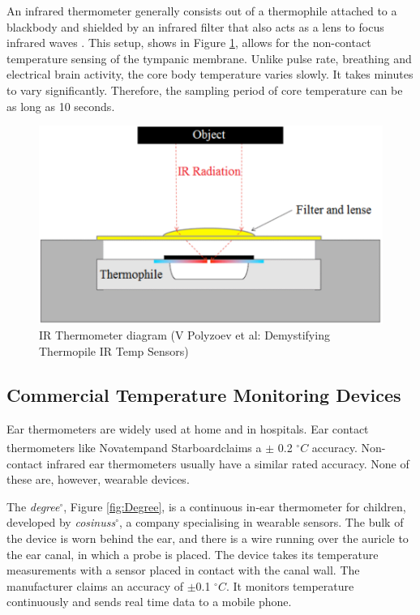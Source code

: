 \medskip

An infrared thermometer generally consists out of a thermophile attached to a blackbody and shielded by an infrared filter that also acts as a lens to focus infrared waves \citep{irTempSensors}. This setup, shows in Figure \ref{fig:IR_Thermometer}, allows for the non-contact temperature sensing of the tympanic membrane. Unlike pulse rate, breathing and electrical brain activity, the core body temperature varies slowly. It takes minutes to vary significantly. Therefore, the sampling period of core temperature can be as long as 10 seconds.

\medskip

\begin{figure}
   \centering
   \includegraphics[scale=0.5]{figs/IR_Thermometer}
   \caption{IR Thermometer diagram (V Polyzoev et al: Demystifying Thermopile IR Temp Sensors)}
   \label{fig:IR_Thermometer}
\end{figure}

\subsection{Commercial Temperature Monitoring Devices}
Ear thermometers are widely used at home and in hospitals. Ear contact thermometers like Novatemp\textsuperscript \textregistered and Starboard\textsuperscript \textregistered claims a $\pm$ 0.2 $^{\circ}C$ accuracy. Non-contact infrared ear thermometers usually have a similar rated accuracy. None of these are, however, wearable devices. 

\medskip
 
The \textit{degree}$^{\circ}$, Figure \ref{fig:Degree}, is a continuous in-ear thermometer for children, developed by \textit{cosinuss}$^{\circ}$, a company specialising in wearable sensors. The bulk of the device is worn behind the ear, and there is a wire running over the auricle to the ear canal, in which a probe is placed. The device takes its temperature measurements with a sensor placed in contact with the canal wall. The manufacturer claims an accuracy of $\pm$0.1 $^{\circ}C$. It monitors temperature continuously and sends real time data to a mobile phone.

